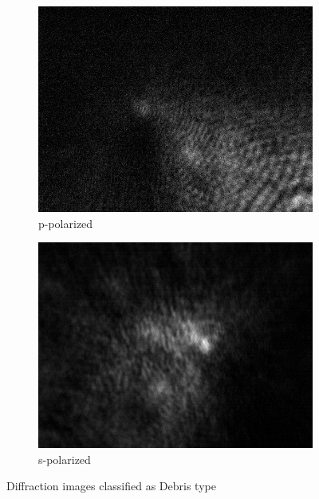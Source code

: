 \begin{figure}[!h]
\begin{subfigure}[b]{0.2\textwidth}
    \includegraphics[width=\textwidth]{diffraction_image/2015040117594700050-1}
    \caption{p-polarized}
  \end{subfigure}
  \begin{subfigure}[b]{0.2\textwidth}
    \includegraphics[width=\textwidth]{diffraction_image/2015040117594700050-2}
    \caption{s-polarized}
  \end{subfigure}
  \caption{Diffraction images classified as Debris type}
\end{figure}
